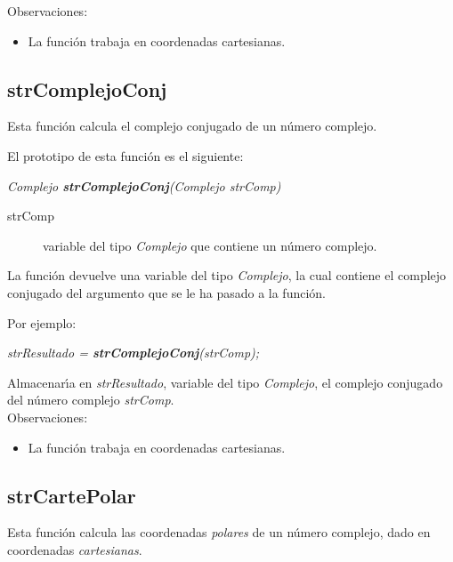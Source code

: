 Observaciones:

\begin{itemize}
\item La funci\'on trabaja en coordenadas cartesianas.
\end{itemize}

\subsection{strComplejoConj}
Esta funci\'on calcula el complejo conjugado de un n\'umero complejo.\newline

El prototipo de esta funci\'on es el siguiente:

\begin{center}
\emph{Complejo \textbf{strComplejoConj}(Complejo strComp)}
\end{center}

\begin{description}
\item[strComp] variable del tipo \emph{Complejo} que contiene un n\'umero 
complejo.
\end{description}

La funci\'on devuelve una variable del tipo \emph{Complejo}, la cual contiene
el complejo conjugado del argumento que se le ha pasado a la funci\'on.\newline

Por ejemplo:

\begin{center}
\emph{strResultado = \textbf{strComplejoConj}(strComp);}
\end{center}

Almacenar\'{\i}a en \emph{strResultado}, variable del tipo \emph{Complejo}, el
complejo conjugado del n\'umero complejo \emph{strComp}.\\

Observaciones:

\begin{itemize}
\item La funci\'on trabaja en coordenadas cartesianas.
\end{itemize}

\subsection{strCartePolar}
Esta funci\'on calcula las coordenadas \emph{polares} de un n\'umero complejo,
dado en coordenadas \emph{cartesianas}.\newline

